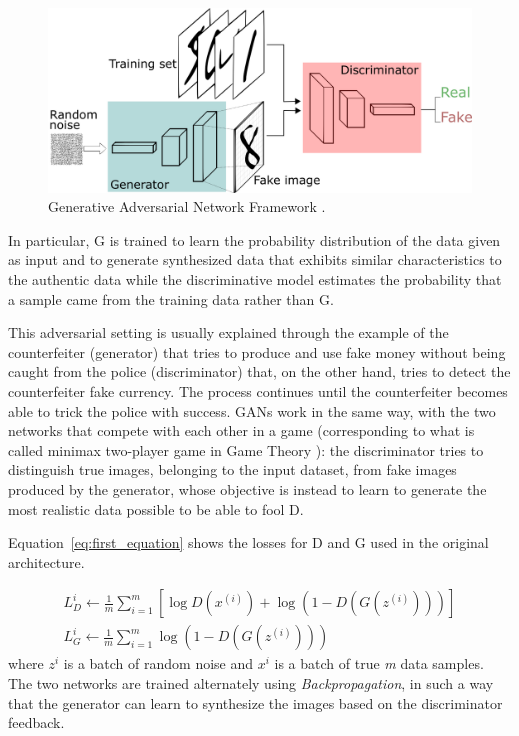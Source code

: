 \begin{figure}[H]
\centering
\includegraphics[height=0.27\textheight]{images/GANs.pdf}
\caption[Generative Adversarial Network Framework]{Generative Adversarial Network Framework \cite{GAN_image}.}
\label{fig:GANs}
\end{figure}
In particular, G is trained to learn the probability distribution of the data given as input and to generate synthesized data that exhibits similar characteristics to the authentic data while the discriminative model estimates the probability that a sample came from the training data rather than G.

\vspace{5mm} %
This adversarial setting is usually explained through the example of the counterfeiter (generator) that tries to produce and use fake money without being caught from the police (discriminator) that, on the other hand, tries to detect the counterfeiter fake currency. The process continues until the counterfeiter becomes able to trick the police with success. \ac{GAN}s work in the same way, with the two networks that compete with each other in a game (corresponding to what is called minimax two-player game in Game Theory \cite[p.~276]{optimization}): the discriminator tries to distinguish true images, belonging to the input dataset, from fake images produced by the generator, whose objective is instead to learn to generate the most realistic data possible to be able to fool D.

Equation~\ref{eq:first_equation} shows the losses for D and G used in the original architecture\cite{gan}.

\begin{equation} \label{eq:first_equation}
\begin{gathered}
L_D^i \leftarrow \frac{1}{m} \sum_{i=1}^{m} [\log D(x^{(i)}) + \log(1 - D(G(z^{(i)})))] \\
L_G^i \leftarrow \frac{1}{m} \sum_{i=1}^{m} \log(1 - D(G(z^{(i)})))
\end{gathered}
\end{equation}
where $z^i$ is a batch of random noise and $x^i$ is a batch of true \textit{m} data samples.
The two networks are trained alternately using \textit{Backpropagation}, in such a way that the generator can learn to synthesize the images based on the discriminator feedback. 

